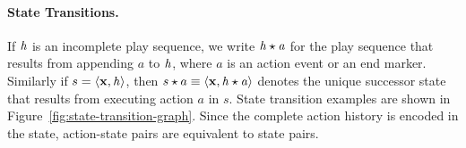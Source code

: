 \documentclass[runningheads,a4paper]{llncs}
\def\set#1{\mathbf{#1}}
\newcommand{\mstate}{s}
\newcommand{\mfeatures}{\set{x}}
\newcommand{\action}{a}
\newcommand{\history}{\it{h}}
\begin{document}
\paragraph{State Transitions.}
\label{subsec:transitions}

If $\history$ is an incomplete play sequence, we write $\history \star \action$ for the play sequence that results from appending $\action$ to $\history$, where $\action$ is an action event or an end marker.
Similarly if $\mstate = \langle \mfeatures, \history \rangle$, then $\mstate \star \action \equiv \langle \mfeatures, \history \star \action \rangle$ denotes the unique successor state that results from executing action $\action$ in  $\mstate$.
State transition examples are shown in Figure~\ref{fig:state-transition-graph}. Since the complete action history is encoded in the state, action-state pairs are equivalent to state pairs.

\end{document}

